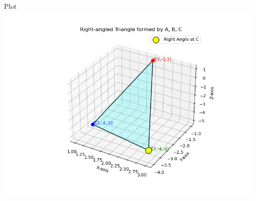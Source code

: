 \documentclass{beamer}
\begin{document}
\begin{frame}{Plot}
    \centering
    \includegraphics[width=\columnwidth, height=0.8\textheight, keepaspectratio]{Figs/Fig1.png}     
\end{frame}
\end{document}
